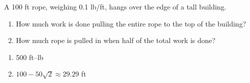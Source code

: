 {A 100 ft rope, weighing 0.1 lb/ft, hangs over the edge of a tall building.
	\begin{enumerate}
	\item		How much work is done pulling the entire rope to the top of the building?
	\item		How much rope is pulled in when half of the total work is done?
	\end{enumerate}}
{\begin{enumerate}
	\item 	500 ft--lb
	\item		$100-50\sqrt{2} \approx 29.29$ ft
	\end{enumerate}
}
